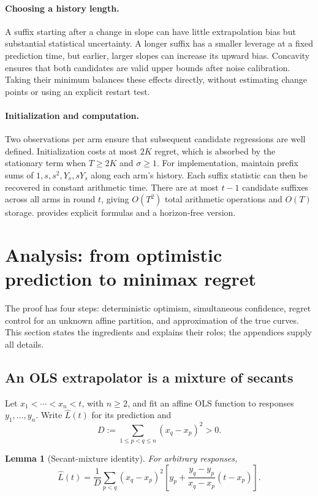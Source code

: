 \documentclass[11pt]{article}
\newtheorem{lemma}[lemma]{Lemma}
\theoremstyle{remark}
\begin{document}
\paragraph{Choosing a history length.}
A suffix starting after a change in slope can have little extrapolation bias but substantial statistical uncertainty. A longer suffix has a smaller leverage at a fixed prediction time, but earlier, larger slopes can increase its upward bias. Concavity ensures that both candidates are valid upper bounds after noise calibration. Taking their minimum balances these effects directly, without estimating change points or using an explicit restart test.

\paragraph{Initialization and computation.}
Two observations per arm ensure that subsequent candidate regressions are well defined. Initialization costs at most $2K$ regret, which is absorbed by the stationary term when $T\ge2K$ and $\sigma\ge1$. For implementation, maintain prefix sums of $1,s,s^2,Y_s,sY_s$ along each arm's history. Each suffix statistic can then be recovered in constant arithmetic time. There are at most $t-1$ candidate suffixes across all arms in round $t$, giving $O(T^2)$ total arithmetic operations and $O(T)$ storage.  provides explicit formulas and a horizon-free version.

\section{Analysis: from optimistic prediction to minimax regret}\label{sec:overview}

The proof has four steps: deterministic optimism, simultaneous confidence, regret control for an unknown affine partition, and approximation of the true curves. This section states the ingredients and explains their roles; the appendices supply all details.

\subsection{An OLS extrapolator is a mixture of secants}

Let $x_1<\cdots<x_n<t$, with $n\ge2$, and fit an affine OLS function to responses $y_1,\ldots,y_n$. Write $\widehat L(t)$ for its prediction and
\[
D:=\sum_{1\le p<q\le n}(x_q-x_p)^2>0.
\]

\begin{samepage}
\begin{lemma}[Secant-mixture identity]\label{lem:secant-main}
For arbitrary responses,
\begin{equation}\label{eq:secant-main}
\widehat L(t)=\frac1D\sum_{p<q}(x_q-x_p)^2
\left[y_p+\frac{y_q-y_p}{x_q-x_p}(t-x_p)\right].
\end{equation}
\end{lemma}
\end{samepage}
\end{document}

